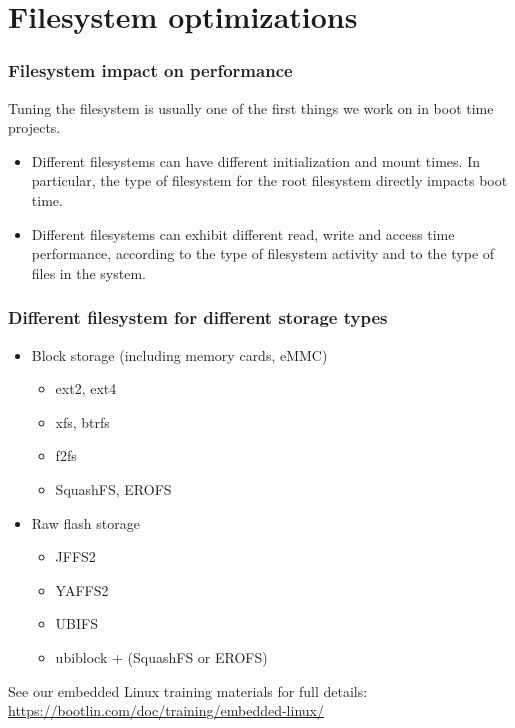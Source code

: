 \section{Filesystem optimizations}

\begin{frame}
\frametitle{Filesystem impact on performance}
Tuning the filesystem is usually one of the first things
we work on in boot time projects.
\begin{itemize}
\item Different filesystems can have different initialization
      and mount times. In particular, the type of filesystem
      for the root filesystem directly impacts boot time.
\item Different filesystems can exhibit different read, write
      and access time performance, according to the type
      of filesystem activity and to the type of files in the
      system.
\end{itemize}
\end{frame}

\begin{frame}
\frametitle{Different filesystem for different storage types}
\begin{itemize}
\item Block storage (including memory cards, eMMC)
      \begin{itemize}
      \item ext2, ext4
      \item xfs, btrfs
      \item f2fs
      \item SquashFS, EROFS
      \end{itemize}
\item Raw flash storage
      \begin{itemize}
      \item JFFS2
      \item YAFFS2
      \item UBIFS
      \item ubiblock + (SquashFS or EROFS)
      \end{itemize}
\end{itemize}
See our embedded Linux training materials for full details:
{\small
\url{https://bootlin.com/doc/training/embedded-linux/}
}
\end{frame}

